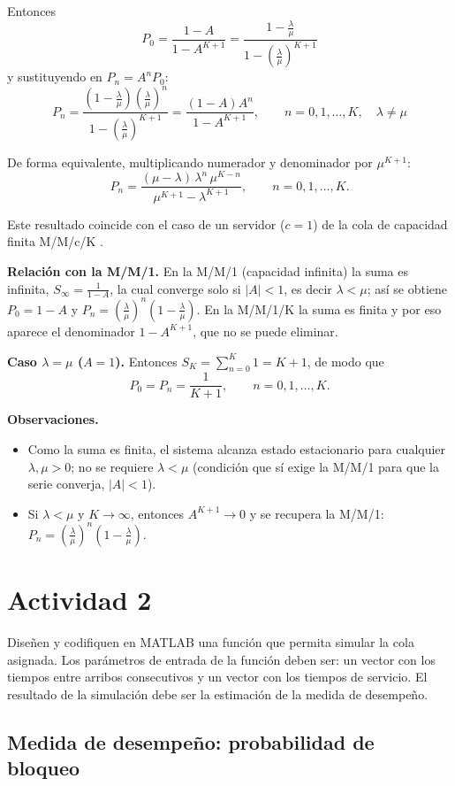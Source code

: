 \documentclass[12pt]{article}
\begin{document}
Entonces
\[
\boxed{P_0=\frac{1-A}{1-A^{K+1}}=\frac{1-\frac{\lambda}{\mu}}{1-\left(\frac{\lambda}{\mu}\right)^{K+1}}}
\]
y sustituyendo en $P_n=A^nP_0$:
\[
\boxed{P_n=\frac{\left(1-\frac{\lambda}{\mu}\right)\left(\frac{\lambda}{\mu}\right)^{n}}{1-\left(\frac{\lambda}{\mu}\right)^{K+1}}=\frac{(1-A)A^n}{1-A^{K+1}},\qquad n=0,1,\dots,K,\quad \lambda\neq\mu}
\]

De forma equivalente, multiplicando numerador y denominador por $\mu^{K+1}$:
\[
P_n=\frac{(\mu-\lambda)\,\lambda^{n}\,\mu^{K-n}}{\mu^{K+1}-\lambda^{K+1}},\qquad n=0,1,\dots,K .
\]

Este resultado coincide con el caso de un servidor ($c=1$) de la cola de capacidad finita M/M/c/K \autocite[cap.~3]{shortle2018}.

\textbf{Relación con la M/M/1.} En la M/M/1 (capacidad infinita) la suma es infinita, $S_\infty=\frac{1}{1-A}$, la cual converge solo si $|A|<1$, es decir $\lambda<\mu$; así se obtiene $P_0=1-A$ y $P_n=\left(\frac{\lambda}{\mu}\right)^n\left(1-\frac{\lambda}{\mu}\right)$. En la M/M/1/K la suma es finita y por eso aparece el denominador $1-A^{K+1}$, que no se puede eliminar.

\textbf{Caso $\lambda=\mu$ ($A=1$).} Entonces $S_K=\sum_{n=0}^{K}1=K+1$, de modo que
\[
P_0=P_n=\frac{1}{K+1},\qquad n=0,1,\dots,K .
\]

\textbf{Observaciones.}
\begin{itemize}
    \item Como la suma es finita, el sistema alcanza estado estacionario para cualquier $\lambda,\mu>0$; no se requiere $\lambda<\mu$ (condición que sí exige la M/M/1 para que la serie converja, $|A|<1$).
    \item Si $\lambda<\mu$ y $K\to\infty$, entonces $A^{K+1}\to 0$ y se recupera la M/M/1: $P_n=\left(\frac{\lambda}{\mu}\right)^n\left(1-\frac{\lambda}{\mu}\right)$.
\end{itemize}

\section{Actividad 2}

Diseñen y codifiquen en MATLAB una función que permita simular la cola asignada. Los parámetros de entrada de la función deben ser: un vector con los tiempos entre arribos consecutivos y un vector con los tiempos de servicio. El resultado de la simulación debe ser la estimación de la medida de desempeño.

\subsection{Medida de desempeño: probabilidad de bloqueo}
\end{document}
